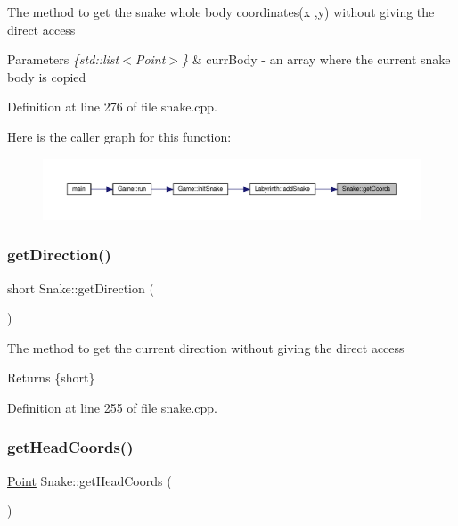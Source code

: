 The method to get the snake whole body coordinates(x ,y) without giving the direct access 
\begin{DoxyParams}{Parameters}
{\em \{std\+::list$<$\+Point$>$\}} & curr\+Body -\/ an array where the current snake body is copied \\
\hline
\end{DoxyParams}


Definition at line 276 of file snake.\+cpp.

Here is the caller graph for this function\+:
\nopagebreak
\begin{figure}[H]
\begin{center}
\leavevmode
\includegraphics[width=350pt]{class_snake_a62fa59de03f60c23f6d1100c53594d71_icgraph}
\end{center}
\end{figure}
\mbox{\label{class_snake_a2656a9a4490cbb70d305c323269cc5bd}} 
\subsubsection{\texorpdfstring{getDirection()}{getDirection()}}
{\footnotesize\ttfamily short Snake\+::get\+Direction (\begin{DoxyParamCaption}{ }\end{DoxyParamCaption})}

The method to get the current direction without giving the direct access \begin{DoxyReturn}{Returns}
\{short\} 
\end{DoxyReturn}


Definition at line 255 of file snake.\+cpp.

\mbox{\label{class_snake_a0235581bc3d6399f4fd2287669f93cee}} 
\subsubsection{\texorpdfstring{getHeadCoords()}{getHeadCoords()}}
{\footnotesize\ttfamily \mbox{\hyperlink{common_8h_aa9cfdb80b4ca12013a2de8a3b9b97981}{Point}} Snake\+::get\+Head\+Coords (\begin{DoxyParamCaption}{ }\end{DoxyParamCaption})}

